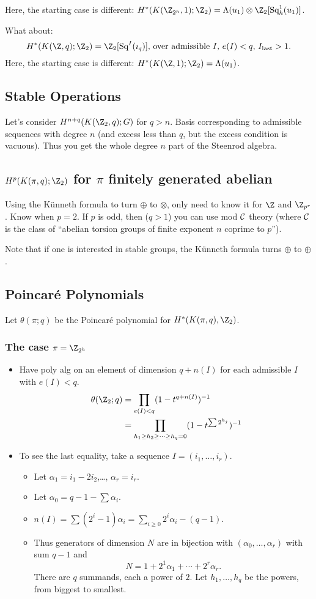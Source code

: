 \documentclass[11pt]{article}
\begin{document}
\begin{SerreCohModTwoEilMacLane}
\begin{itemise}
Here, the starting case is different: $H^*(K(\Z_{2^h},1);\Z_2)=\Lambda(u_1)\otimes\Z_2[\Squ_h^1(u_1)]$.
\item What about:
\[\text{$H^*(K(\Z,q);\Z_2)=\Z_2[\Squ^I(\imath_q)]$, over admissible $I$, $e(I)<q$, $I_\text{last}>1$.}\]
Here, the starting case is different: $H^*(K(\Z,1);\Z_2)=\Lambda(u_1)$.
\end{itemise}
\subsection*{Stable Operations}
Let's consider $H^{n+q}(K(\Z_2,q);G)$ for $q>n$. Basis corresponding to admissible sequences with degree $n$ (and excess less than $q$, but the excess condition is vacuous). Thus you get the whole degree $n$ part of the Steenrod algebra.
\subsection*{$H^p(K(\pi,q);\Z_2)$ for $\pi$ finitely generated abelian}
Using the K\"unneth formula to turn $\oplus$ to $\otimes$, only need to know it for $\Z$ and $\Z_{p^r}$. Know when $p=2$. If $p$ is odd, then ($q>1$) you can use mod $\mathcal{C}$ theory (where $\mathcal{C}$ is the class of ``abelian torsion groups of finite exponent $n$ coprime to $p$'').

Note that if one is interested in stable groups, the K\"unneth formula turns $\oplus$ to $\oplus$.
\subsection*{Poincar\'e Polynomials}
Let $\theta(\pi;q)$ be the Poincar\'e polynomial for $H^*(K(\pi,q),\Z_2)$.
\subsubsection*{The case $\pi=\Z_{2^h}$}
\begin{itemize}\squishlist
\item Have poly alg on an element of dimension $q+n(I)$ for each admissible $I$ with $e(I)<q$.
\begin{align*}
\theta(\Z_2;q)&=\prod_{e(I)<q}(1-t^{q+n(I)})^{-1}\\
&=\prod_{h_1\geq h_2\geq\cdots\geq h_{q}=0}(1-t^{\sum2^{h_j}})^{-1}
\end{align*}
\item To see the last equality, take a sequence $I=(i_1,\ldots,i_r)$.
\begin{itemize}\squishlist
\item Let $\alpha_1=i_1-2i_2$,\ldots, $\alpha_r=i_r$.
\item Let $\alpha_0=q-1-\sum\alpha_i$.
\item $n(I)=\sum (2^i-1)\alpha_i=\sum_{i\geq0}2^i\alpha_i-(q-1)$.
\item Thus generators of dimension $N$ are in bijection with $(\alpha_0,\ldots,\alpha_r)$ with sum $q-1$ and
\[N=1+2^1\alpha_1+\cdots+2^r\alpha_r.\]
There are $q$ summands, each a power of $2$. Let $h_1,\ldots, h_q$ be the powers, from biggest to smallest.
\end{itemize}
\end{itemize}

\end{SerreCohModTwoEilMacLane}
\end{document}

